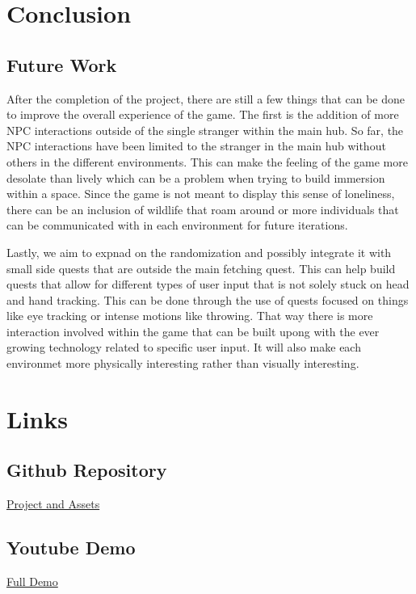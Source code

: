 \documentclass{vgtc}                          %
\begin{document}
\section{Conclusion}
\subsection*{Future Work}
After the completion of the project, there are still a few things that can be done to improve the overall experience of the game. The first is the addition of more NPC interactions outside of the single stranger within the main hub. So far, the NPC interactions have been limited to the stranger in the main hub without others in the different environments. This can make the feeling of the game more desolate than lively
which can be a problem when trying to build immersion within a space. Since the game is not meant to display this sense of loneliness, there can be an inclusion of wildlife that roam around or more individuals that can be communicated with in each environment for future iterations.

Lastly, we aim to expnad on the randomization and possibly integrate it with small side quests that are outside the main fetching quest. This can help build quests that allow for different types of user input that is not solely stuck on head and hand tracking. This can be done through the use of quests focused on things like eye tracking or intense motions like throwing. That way there is more interaction involved within
the game that can be built upong with the ever growing technology related to specific user input. It will also make each environmet more physically interesting rather than visually interesting.

\section* {Links}
\subsection* {Github Repository}
\href{https://github.com/CRamoutar2/VR-Class-Project/tree/Completed-Game}{Project and Assets}
\subsection*{Youtube Demo}
\href{https://www.youtube.com/watch?v=uKfVXEuRD80}{Full Demo}

%

%
%
%


\end{document}
